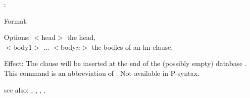 \azhn:

Format: 

Options: $<$head$>$ the head,\\
	 $<$body$1>$ ... $<$body$n>$ the bodies of an hn clause.

Effect: The clause 
        will be inserted at the
	end of the (possibly empty) database .
	This command is an abbreviation of 
        .
        Not available in P-syntax.

see also: \az, \azft, \consult, \destroy, \replace
